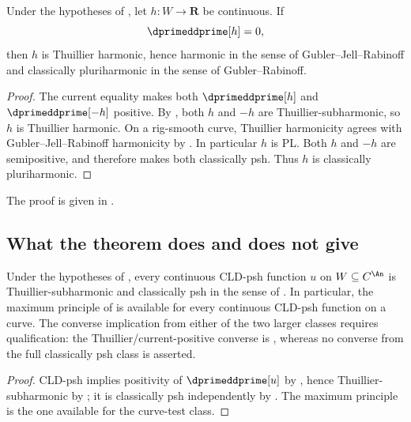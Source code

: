 \begin{corollary}
\label{cor:ch19-continuous-zero-current-harmonic}
Under the hypotheses of , let
$h:W\to\mathbf R$ be continuous.  If
\[
                         \dprimeddprime[h]=0,
\]
then $h$ is Thuillier harmonic, hence harmonic in the sense of
Gubler--Jell--Rabinoff and classically pluriharmonic in the sense of
Gubler--Rabinoff.
\end{corollary}

\begin{proof}
The current equality makes both $\dprimeddprime[h]$ and
$\dprimeddprime[-h]$ positive.  By
, both $h$ and $-h$ are
Thuillier-subharmonic, so $h$ is Thuillier harmonic.  On a rig-smooth curve,
Thuillier harmonicity agrees with Gubler--Jell--Rabinoff harmonicity by
\cite[Proposition~15.7]{GJR26}.  In particular $h$ is PL.  Both $h$ and
$-h$ are semipositive, and  therefore makes both
classically psh.  Thus $h$ is classically pluriharmonic.
\end{proof}



The proof is given in .

\subsection{What the theorem does and does not give}
\label{sec:ch19-wanner-scope}

\begin{corollary}
\label{cor:ch19-curve-three-classes}
Under the hypotheses of , every continuous
CLD-psh function $u$ on $W\subseteq C^{\An}$ is
Thuillier-subharmonic and classically psh in the sense of
.  In particular, the maximum principle of
 is available for every continuous CLD-psh
function on a curve.  The converse implication from either of the two larger
classes requires qualification: the Thuillier/current-positive converse is
, whereas no converse from
the full classically psh class is asserted.
\end{corollary}

\begin{proof}
CLD-psh implies positivity of $\dprimeddprime[u]$ by
, hence Thuillier-subharmonic by
; it is classically psh independently by
.  The maximum principle is the one available
for the curve-test class.
\end{proof}

